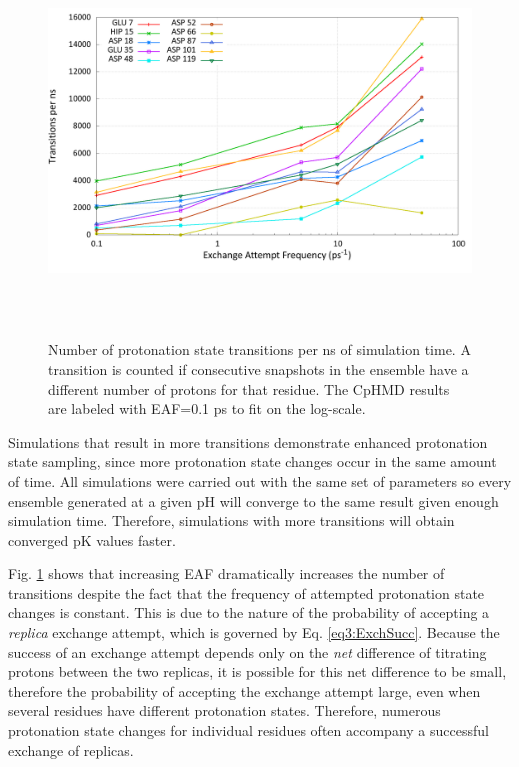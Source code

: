 \begin{figure}
 \includegraphics[width=6.5in, height=4.06in]{transitions.png}
 \caption{Number of protonation state transitions per ns of simulation time. A
          transition is counted if consecutive snapshots in the ensemble have a
          different number of protons for that residue. The CpHMD results are
          labeled with EAF=0.1 ps to fit on the log-scale.}
 \label{fig3:transitions}
\end{figure}

Simulations that result in more transitions demonstrate enhanced protonation
state sampling, since more protonation state changes occur in the same amount of
time.  All simulations were carried out with the same set of parameters so every
ensemble generated at a given pH will converge to the same result given enough
simulation time.  Therefore, simulations with more transitions will obtain
converged pK values faster.

Fig. \ref{fig3:transitions} shows that increasing EAF dramatically increases the
number of transitions despite the fact that the frequency of attempted
protonation state changes is constant. This is due to the nature of the
probability of accepting a \emph{replica} exchange attempt, which is governed by
Eq. \ref{eq3:ExchSucc}. Because the success of an exchange attempt depends only
on the \emph{net} difference of titrating protons between the two replicas, it
is possible for this net difference to be small, therefore the probability of
accepting the exchange attempt large, even when several residues have different
protonation  states.  Therefore, numerous protonation state changes for
individual residues often accompany a successful exchange of replicas.

